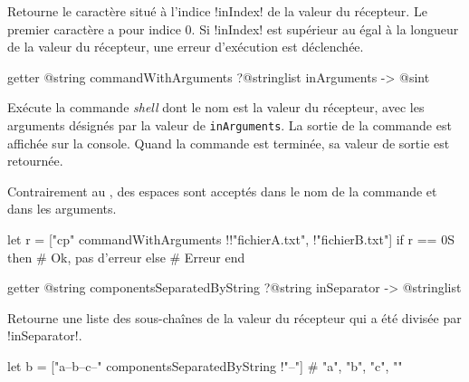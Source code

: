 Retourne le caractère situé à l'indice \ggst!inIndex! de la valeur du récepteur. Le premier caractère a pour indice $0$. Si \ggst!inIndex! est supérieur au égal à la longueur de la valeur du récepteur, une erreur d'exécution est déclenchée.












\begin{galgas3box}
getter @string commandWithArguments ?@stringlist inArguments -> @sint
\end{galgas3box}
Exécute la commande \emph{shell} dont le nom est la valeur du récepteur, avec les arguments désignés par la valeur de \texttt{inArguments}. La sortie de la commande est affichée sur la console. Quand la commande est terminée, sa valeur de sortie est retournée.

Contrairement au , des espaces sont acceptés dans le nom de la commande et dans les arguments.

\begin{galgas3}
let r = ["cp" commandWithArguments !{!"fichierA.txt", !"fichierB.txt"}]
if r == 0S then
  # Ok, pas d'erreur
else
  # Erreur
end
\end{galgas3}
















\begin{galgas3box}
getter @string componentsSeparatedByString ?@string inSeparator -> @stringlist
\end{galgas3box}
Retourne une liste des sous-chaînes de la valeur du récepteur qui a été divisée par \ggst!inSeparator!.

\begin{galgas3}
let b = ["a--b--c--" componentsSeparatedByString !"--"]
# "a", "b", "c", ""
\end{galgas3}












